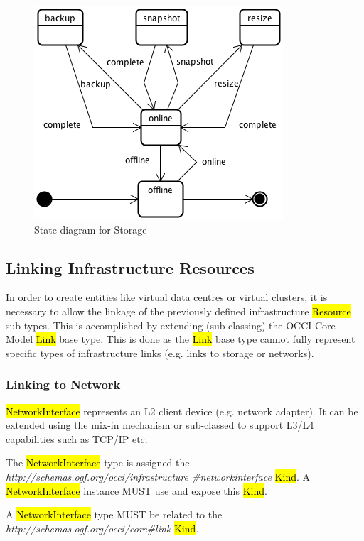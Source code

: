 \documentclass[10pt,a4paper]{article}
\begin{document}
\begin{figure}[!h]
	\centering
	\includegraphics[scale=0.4]{figs/storage-state.png}
	\caption{State diagram for Storage}
	\label{fig:storage_state}
\end{figure}

\subsection{Linking Infrastructure Resources}
In order to create entities like virtual data centres or virtual clusters, it is necessary to allow the linkage of the previously defined infrastructure \hl{Resource} sub-types. This is accomplished by extending (sub-classing) the OCCI Core Model \hl{Link} base type. This is done as the \hl{Link} base type cannot fully represent specific types of infrastructure links (e.g. links to storage or networks).

\subsubsection{Linking to Network}
\hl{NetworkInterface} represents an L2 client device (e.g. network adapter). It can be extended using the mix-in mechanism or sub-classed to support L3/L4 capabilities such as TCP/IP etc. 

The \hl{NetworkInterface} type is assigned the \textit{http://schemas.ogf.org/occi/infrastructure
\#networkinterface} \hl{Kind}. A \hl{NetworkInterface} instance MUST use and expose this \hl{Kind}. 

A \hl{NetworkInterface} type MUST be related to the \textit{http://schemas.ogf.org/occi/core\#link} 
\hl{Kind}.
\end{document}
